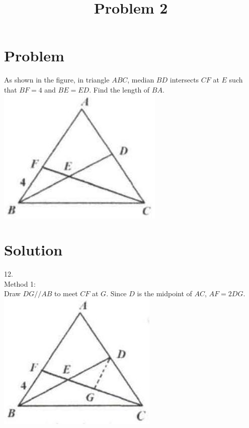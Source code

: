 \documentclass{article}
\title{Problem 2}
\date{}
\begin{document}
\maketitle

\section*{Problem}
As shown in the figure, in triangle \(A B C\), median \(B D\) intersects \(C F\) at \(E\) such that \(B F=4\) and \(B E=E D\). Find the length of \(B A\).\\
\centering
\includegraphics[width=\textwidth]{images/126(2).jpg}

\section*{Solution}
12.\\
Method 1:\\
Draw \(D G / / A B\) to meet \(C F\) at \(G\). Since \(D\) is the midpoint of \(A C\), \(A F=2 D G\).\\
\centering
\includegraphics[width=\textwidth]{images/131(1).jpg}
\end{document}
